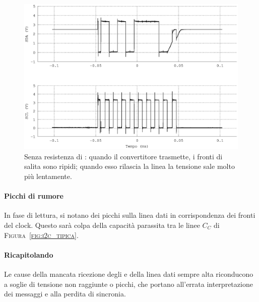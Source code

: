 \begin{figure}
\centering
  \includegraphics[width=.5\textwidth]{RampaNero}
	\caption{Senza resistenza di \pullup{}: quando il convertitore trasmette, i fronti di salita sono ripidi; quando esso rilascia la linea la tensione sale molto più lentamente.}
    \label{fig:i2c_rampa}
\end{figure}

\paragraph{Picchi di rumore}
In fase di lettura, si notano dei picchi sulla linea dati
in corrispondenza dei fronti del clock.
Questo sarà colpa della capacità parassita
tra le linee $C_C$ di \textsc{Figura~\ref{fig:i2c_tipica}}.\\

\paragraph{Ricapitolando}
Le cause della mancata ricezione degli \Ack{}
e della linea dati sempre alta
riconducono a soglie di tensione non raggiunte o picchi,
che portano all'errata interpretazione dei messaggi
e alla perdita di sincronia.








